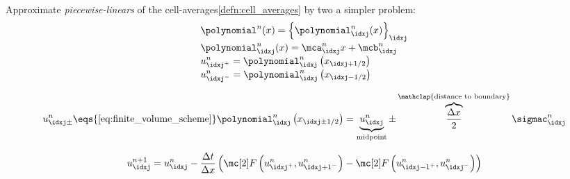 \begin{defnbox}\nospacing
    \begin{defn}\label{defn:approximate_reconstruction}\leavevmode\\
        \begin{minipage}{0.5\textwidth}
            Approximate \textit{piecewise-linears} of the cell-averages\cref{defn:cell_averages} by
            two a simpler problem:
        \begin{align*}
          &\polynomial^{n}(x)=\left\{\polynomial_{\idxj}^{n}(x)\right\}_{\idxj}\\[-1\jot]
          &\polynomial_{\idxj}^{n}(x)=\mca_{\idxj}^{n}x+\mcb_{\idxj}^{n}\\[-1\jot]
          &u_{\idxj^{+}}^{n}=\polynomial_{\idxj}^{n}\left(x_{\idxj+1/2}\right)\\[-1\jot]
          &u_{\idxj^{-}}^{n}=\polynomial_{\idxj}^{n}\left(x_{\idxj-1/2}\right)
        \end{align*}
        \end{minipage}
        \begin{minipage}[c]{0.45\textwidth}
            \begin{figure}[H]
                \centering{
                  \def\svgwidth{100pt}
                  \resizebox{0.85\linewidth}{!}{}
                }
            \end{figure}
        \end{minipage}
    \end{defn}
\end{defnbox}
\begin{corbox}\nospacing
    \begin{cor}
        \begin{align}
          u_{\idxj\pm}^{n}\eqs{\text{\cref{eq:finite_volume_scheme}}}\polynomial_{\idxj}^{n} \left(x_{\idxj\pm 1/2}\right)=\underbrace{u_{\idxj}^{n}}_{\text{midpoint}}\pm\overbrace{\frac{\Delta x}{2}}^{\mathclap{\text{distance to boundary}}}\sigmac_{\idxj}^{n}\label{eq:linear_reconstruction_approximation}
        \end{align}
    \end{cor}
\end{corbox}
\begin{defnbox}\nospacing
    \begin{defn}\label{defn:fvm_evolution_and_averaging}
        \begin{align}
          u_{\idxj}^{n+1}=u_{\idxj}^{n}-\frac{\Delta t}{\Delta x}
          \left(\Flux \left(u_{\idxj^{+}}^{n},u_{{\idxj+1}^{-}}^{n}\right)-
         \Flux \left(u_{{\idxj-1}^{+}}^{n},u_{{\idxj}^{-}}^{n}\right) \right)\label{eq:evolution_and_averaging}
        \end{align}
    \end{defn}
\end{defnbox}
